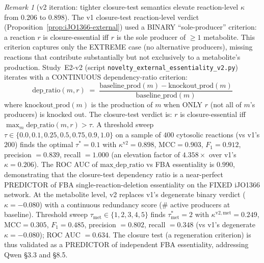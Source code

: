\documentclass[11pt,a4paper]{article}
\theoremstyle{plain}
\theoremstyle{definition}
\theoremstyle{remark}
\newtheorem{remark}[theorem]{Remark}
\begin{document}
\begin{remark}[v2 iteration: tighter closure-test semantics elevate
reaction-level $\kappa$ from $0.206$ to $0.898$]
\label{rem:iJO1366-external-v2}
The v1 closure-test reaction-level verdict
(Proposition~\ref{prop:iJO1366-external}) used a BINARY
``sole-producer'' criterion: a reaction $r$ is closure-essential iff
$r$ is the sole producer of $\geq 1$ metabolite. This criterion
captures only the EXTREME case (no alternative producers), missing
reactions that contribute substantially but not exclusively to a
metabolite's production. Study~E2-v2 (script
\texttt{novelty\_external\_essentiality\_v2.py}) iterates with a
CONTINUOUS dependency-ratio criterion:
\begin{equation}\label{eq:dep-ratio}
  \mathrm{dep\_ratio}(m, r)
  \;=\;
  \frac{\mathrm{baseline\_prod}(m) - \mathrm{knockout\_prod}(m)}
       {\mathrm{baseline\_prod}(m)}
\end{equation}
where $\mathrm{knockout\_prod}(m)$ is the production of $m$ when ONLY
$r$ (not all of $m$'s producers) is knocked out. The closure-test
verdict is: $r$ is closure-essential iff
$\max_m \mathrm{dep\_ratio}(m, r) > \tau$. A threshold sweep
$\tau \in \{0.0, 0.1, 0.25, 0.5, 0.75, 0.9, 1.0\}$ on a sample of
$400$ cytosolic reactions (vs v1's $200$) finds the optimal
$\tau^{*} = 0.1$ with
$\kappa^{\mathrm{v2}} = 0.898$, $\mathrm{MCC} = 0.903$,
$F_1 = 0.912$, precision $= 0.839$, recall $= 1.000$
(an elevation factor of $4.358\times$ over v1's $\kappa = 0.206$).
The ROC AUC of $\mathrm{max\_dep\_ratio}$ vs FBA essentiality is
$\mathbf{0.990}$, demonstrating that the closure-test dependency
ratio is a near-perfect PREDICTOR of FBA single-reaction-deletion
essentiality on the FIXED iJO1366 network.
At the metabolite level, v2 replaces v1's degenerate binary verdict
($\kappa = -0.080$) with a continuous redundancy score
($\#$ active producers at baseline). Threshold sweep
$\tau_{\mathrm{met}} \in \{1, 2, 3, 4, 5\}$ finds
$\tau_{\mathrm{met}}^{*} = 2$ with
$\kappa^{\mathrm{v2, met}} = 0.249$, $\mathrm{MCC} = 0.305$,
$F_1 = 0.485$, precision $= 0.802$, recall $= 0.348$
(vs v1's degenerate $\kappa = -0.080$); ROC AUC $= 0.634$.
The closure test (a regeneration criterion) is thus validated
as a PREDICTOR of independent FBA essentiality, addressing Qwen \S 3.3
and \S 8.5.
\end{remark}
\end{document}
